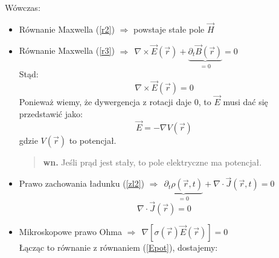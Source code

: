 \documentclass[11pt]{article}
\renewcommand{\r}{\vec{r}}
\renewcommand{\arg}{(\vec{r},t)}
\begin{document}
	Wówczas:\begin{itemize}
	\item Równanie Maxwella (\ref{r2}) $\Rightarrow$ powstaje stałe pole $\vec{H}$
	\item Równanie Maxwella (\ref{r3}) $\Rightarrow ~~ \nabla\times\vec{E}(\r)+\underbrace{\partial_t\vec{B}(\r)}_{=0}=0$ \\
	Stąd:
	\begin{equation} \nabla\times\vec{E}(\r)=0 \end{equation}
	Ponieważ wiemy, że dywergencja z rotacji daje 0, to $\vec{E}$ musi dać się przedstawić jako:
	\begin{equation} \vec{E}=-\nabla V(\r) \label{Epot}\end{equation}
	gdzie $V(\r)$ to potencjał.
	\begin{verse} \textbf{wn.} Jeśli prąd jest stały, to pole elektryczne ma potencjał. \end{verse} 
	\item Prawo zachowania ładunku (\ref{zl2}) $\Rightarrow ~~ \underbrace{\partial_t\rho\arg}_{=0}+\nabla\cdot\vec{J}\arg=0 $
	\begin{equation} \nabla\cdot\vec{J}({\r})=0 \end{equation}
	\item Mikroskopowe prawo Ohma $\Rightarrow ~~ \nabla[\sigma(\r)\vec{E}(\r)]=0$ \\
	Łącząc to równanie z równaniem (\ref{Epot}), dostajemy:
	\end{itemize}
\end{document}
